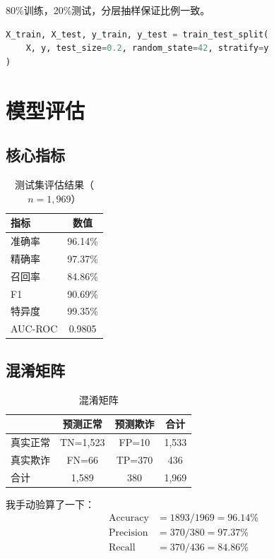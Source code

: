 \documentclass[12pt,a4paper]{article}
\begin{document}
80\%训练，20\%测试，分层抽样保证比例一致。

\begin{lstlisting}[language=Python]
X_train, X_test, y_train, y_test = train_test_split(
    X, y, test_size=0.2, random_state=42, stratify=y
)
\end{lstlisting}

\section{模型评估}

\subsection{核心指标}

\begin{table}[H]
\centering
\caption{测试集评估结果（$n=1{,}969$）}
\begin{tabular}{@{}lc@{}}
\toprule
\textbf{指标} & \textbf{数值} \\
\midrule
准确率 & 96.14\% \\
精确率 & 97.37\% \\
召回率 & 84.86\% \\
F1 & 90.69\% \\
特异度 & 99.35\% \\
AUC-ROC & 0.9805 \\
\bottomrule
\end{tabular}
\end{table}

\subsection{混淆矩阵}

\begin{table}[H]
\centering
\caption{混淆矩阵}
\begin{tabular}{@{}lcc|c@{}}
\toprule
 & 预测正常 & 预测欺诈 & 合计 \\
\midrule
真实正常 & TN=1,523 & FP=10 & 1,533 \\
真实欺诈 & FN=66 & TP=370 & 436 \\
\midrule
合计 & 1,589 & 380 & 1,969 \\
\bottomrule
\end{tabular}
\end{table}

我手动验算了一下：
\begin{align}
\text{Accuracy} & = 1893/1969 = 96.14\% \\
\text{Precision} & = 370/380 = 97.37\% \\
\text{Recall} & = 370/436 = 84.86\%
\end{align}
\end{document}
